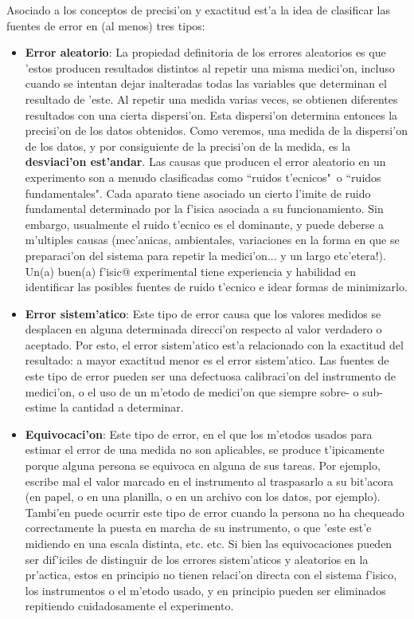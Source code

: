 \documentclass[letterpaper,11pt]{report}
\begin{document}
Asociado a los conceptos de precisi'on y exactitud est'a la idea de clasificar las fuentes de error en (al menos) tres tipos:
\begin{itemize}
\item \textbf{Error aleatorio}: La propiedad definitoria de los errores aleatorios es que 'estos producen resultados distintos al repetir una misma medici'on, incluso cuando se intentan dejar inalteradas todas las variables que determinan el resultado de 'este. Al repetir una medida varias veces, se obtienen diferentes resultados con una cierta dispersi'on. Esta dispersi'on determina entonces la precisi'on de los datos obtenidos. Como veremos, una medida de la dispersi'on de los datos, y por consiguiente de la precisi'on de la medida, es la \textbf{desviaci'on est'andar}. Las causas que producen el error aleatorio en un experimento son a menudo clasificadas como ``ruidos t'ecnicos"\, o ``ruidos fundamentales". Cada aparato tiene asociado un cierto l'imite de ruido fundamental determinado por la f'isica asociada a su funcionamiento. Sin embargo, usualmente el ruido t'ecnico es el dominante, y puede deberse a m'ultiples causas (mec'anicas, ambientales, variaciones en la forma en que se preparaci'on del sistema para repetir la medici'on... y un largo etc'etera!). Un(a) buen(a) f'isic@ experimental tiene experiencia y habilidad en identificar las posibles fuentes de ruido t'ecnico e idear formas de minimizarlo.

\item \textbf{Error sistem'atico}: Este tipo de error causa que los valores medidos se desplacen en alguna determinada direcci'on respecto al valor verdadero o aceptado. Por esto,  el error sistem'atico est'a relacionado con la exactitud del resultado: a mayor exactitud menor es el error sistem'atico. Las fuentes de este tipo de error pueden ser una defectuosa calibraci'on del instrumento de medici'on, o el uso de un m'etodo de medici'on que siempre sobre- o sub-estime la cantidad a determinar.

\item \textbf{Equivocaci'on}: Este tipo de error, en el que los m'etodos usados para estimar el error de una medida no son aplicables, se produce t'ipicamente porque alguna persona se equivoca en alguna de sus tareas. Por ejemplo, escribe mal el valor marcado en el instrumento al traspasarlo a su bit'acora (en papel, o en una planilla, o en un archivo con los datos, por ejemplo). Tambi'en puede ocurrir este tipo de error cuando la persona no ha chequeado correctamente la puesta en marcha de su instrumento, o que 'este est'e midiendo en una escala distinta, etc. etc. Si bien las equivocaciones pueden ser dif'iciles de distinguir de los errores sistem'aticos y aleatorios en la pr'actica, estos en principio no tienen relaci'on directa con el sistema f'isico, los instrumentos o el m'etodo usado, y en principio pueden ser eliminados repitiendo cuidadosamente el experimento.
\end{itemize}
\end{document}
